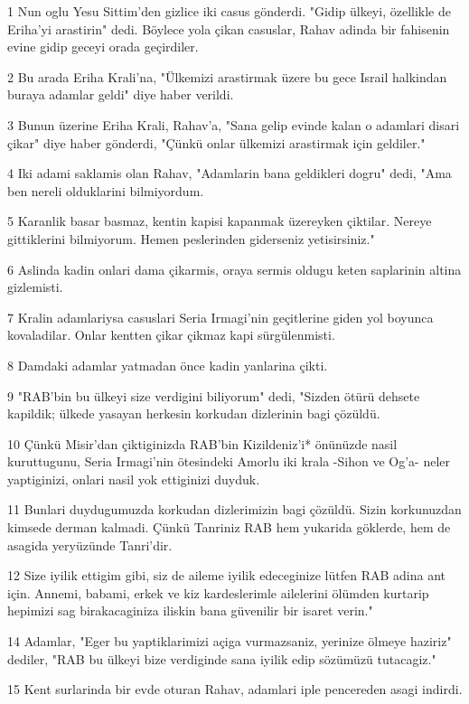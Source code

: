 \par 1 Nun oglu Yesu Sittim'den gizlice iki casus gönderdi. "Gidip ülkeyi, özellikle de Eriha'yi arastirin" dedi. Böylece yola çikan casuslar, Rahav adinda bir fahisenin evine gidip geceyi orada geçirdiler.
\par 2 Bu arada Eriha Krali'na, "Ülkemizi arastirmak üzere bu gece Israil halkindan buraya adamlar geldi" diye haber verildi.
\par 3 Bunun üzerine Eriha Krali, Rahav'a, "Sana gelip evinde kalan o adamlari disari çikar" diye haber gönderdi, "Çünkü onlar ülkemizi arastirmak için geldiler."
\par 4 Iki adami saklamis olan Rahav, "Adamlarin bana geldikleri dogru" dedi, "Ama ben nereli olduklarini bilmiyordum.
\par 5 Karanlik basar basmaz, kentin kapisi kapanmak üzereyken çiktilar. Nereye gittiklerini bilmiyorum. Hemen peslerinden giderseniz yetisirsiniz."
\par 6 Aslinda kadin onlari dama çikarmis, oraya sermis oldugu keten saplarinin altina gizlemisti.
\par 7 Kralin adamlariysa casuslari Seria Irmagi'nin geçitlerine giden yol boyunca kovaladilar. Onlar kentten çikar çikmaz kapi sürgülenmisti.
\par 8 Damdaki adamlar yatmadan önce kadin yanlarina çikti.
\par 9 "RAB'bin bu ülkeyi size verdigini biliyorum" dedi, "Sizden ötürü dehsete kapildik; ülkede yasayan herkesin korkudan dizlerinin bagi çözüldü.
\par 10 Çünkü Misir'dan çiktiginizda RAB'bin Kizildeniz'i* önünüzde nasil kuruttugunu, Seria Irmagi'nin ötesindeki Amorlu iki krala -Sihon ve Og'a- neler yaptiginizi, onlari nasil yok ettiginizi duyduk.
\par 11 Bunlari duydugumuzda korkudan dizlerimizin bagi çözüldü. Sizin korkunuzdan kimsede derman kalmadi. Çünkü Tanriniz RAB hem yukarida göklerde, hem de asagida yeryüzünde Tanri'dir.
\par 12 Size iyilik ettigim gibi, siz de aileme iyilik edeceginize lütfen RAB adina ant için. Annemi, babami, erkek ve kiz kardeslerimle ailelerini ölümden kurtarip hepimizi sag birakacaginiza iliskin bana güvenilir bir isaret verin."
\par 14 Adamlar, "Eger bu yaptiklarimizi açiga vurmazsaniz, yerinize ölmeye haziriz" dediler, "RAB bu ülkeyi bize verdiginde sana iyilik edip sözümüzü tutacagiz."
\par 15 Kent surlarinda bir evde oturan Rahav, adamlari iple pencereden asagi indirdi.
